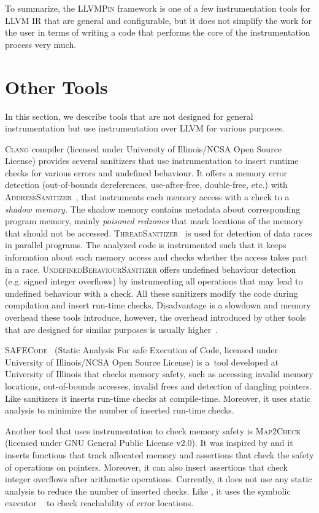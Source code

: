 To summarize, the \textsc{LLVMPin} framework is one of a few instrumentation
tools for LLVM IR that are general and configurable, but it does not simplify
the work for the user in terms of writing a code that performs the core of the
instrumentation process very much.

\section{Other Tools}

In this section, we describe tools that are not designed for general
instrumentation but use instrumentation over LLVM for various purposes.

\textsc{Clang} compiler (licensed under University of Illinois/NCSA Open Source
License) provides several sanitizers that use instrumentation to insert runtime
checks for various errors and undefined behaviour. It offers a memory error
detection (out-of-bounds dereferences, use-after-free, double-free, etc.) with
\textsc{AddressSanitizer}~\cite{asan}, that instruments each memory access with
a check to a \textit{shadow memory}. The shadow memory contains metadata about
corresponding program memory, mainly \textit{poisoned redzones} that mark
locations of the memory that should not be accessed.
\textsc{ThreadSanitizer}~\cite{tsan} is used for detection of data races in
parallel programs. The analyzed code is instrumented such that it keeps
information about each memory access and checks whether the access takes part
in a race.  \textsc{UndefinedBehaviourSanitizer} offers undefined behaviour
detection (e.g. signed integer overflows) by instrumenting all operations that may
lead to undefined behaviour with a check. All these sanitizers modify the code
during compilation and insert run-time checks. Disadvantage is a slowdown and
memory overhead these tools introduce, however, the overhead introduced by other
tools that are designed for similar purposes is usually higher~\cite{tsan,asan}.

\textsc{SAFECode}~\cite{safecode} (Static Analysis For safe Execution of Code,
licensed under University of Illinois/NCSA Open Source License) is a~tool
developed at University of Illinois that checks memory safety, such as
accessing invalid memory locations, out-of-bounds accesses, invalid frees and
detection of dangling pointers. Like \clang sanitizers it inserts run-time
checks at compile-time. Moreover, it uses static analysis to minimize the
number of inserted run-time checks.

Another tool that uses instrumentation to check memory safety is
\textsc{Map2Check}~\cite{map2check} (licensed under GNU General Public License
v2.0). It was inspired by \symbiotic and it inserts functions that track
allocated memory and assertions that check the safety of operations on
pointers.  Moreover, it can also insert assertions that check integer overflows
after arithmetic operations.  Currently, it does not use any static analysis to
reduce the number of inserted checks. Like \symbiotic, it uses the symbolic
executor \klee~\cite{klee} to check reachability of error locations.

